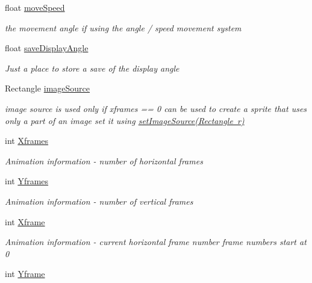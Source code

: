 \begin{DoxyCompactItemize}
float \mbox{\hyperlink{class_r_c___framework_1_1_sprite3_ada8bbec97deb2dca71402963312b59f5}{move\+Speed}}
\begin{DoxyCompactList}\small\item\em the movement angle if using the angle / speed movement system \end{DoxyCompactList}\item 
float \mbox{\hyperlink{class_r_c___framework_1_1_sprite3_a77e1dfb9e0693a43de14ea2d0c565280}{save\+Display\+Angle}}
\begin{DoxyCompactList}\small\item\em Just a place to store a save of the display angle \end{DoxyCompactList}\item 
Rectangle \mbox{\hyperlink{class_r_c___framework_1_1_sprite3_a17993ffc6fc5f0b2008edb24696d5982}{image\+Source}}
\begin{DoxyCompactList}\small\item\em image source is used only if xframes == 0 can be used to create a sprite that uses only a part of an image set it using \mbox{\hyperlink{class_r_c___framework_1_1_sprite3_ac73292a1b053056aa28ecae03165c71d}{set\+Image\+Source(\+Rectangle r)}} \end{DoxyCompactList}\item 
int \mbox{\hyperlink{class_r_c___framework_1_1_sprite3_a19515e51beafff504963c7b4491a7d04}{Xframes}}
\begin{DoxyCompactList}\small\item\em Animation information -\/ number of horizontal frames \end{DoxyCompactList}\item 
int \mbox{\hyperlink{class_r_c___framework_1_1_sprite3_ac70dad68ff6f97705846e0c43db63295}{Yframes}}
\begin{DoxyCompactList}\small\item\em Animation information -\/ number of vertical frames \end{DoxyCompactList}\item 
int \mbox{\hyperlink{class_r_c___framework_1_1_sprite3_a480cad054f3470c3041e4759212b9194}{Xframe}}
\begin{DoxyCompactList}\small\item\em Animation information -\/ current horizontal frame number frame numbers start at 0 \end{DoxyCompactList}\item 
int \mbox{\hyperlink{class_r_c___framework_1_1_sprite3_a337367ffb386b75b771589859fb70813}{Yframe}}

\end{DoxyCompactItemize}
